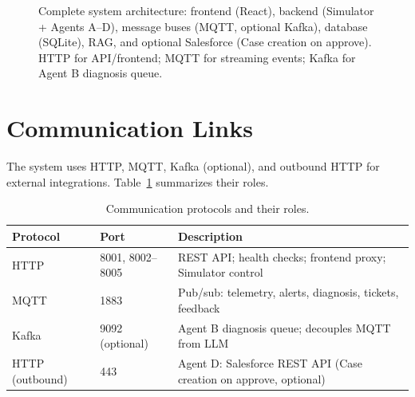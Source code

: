 \documentclass[12pt,letterpaper]{report}
\begin{document}
\begin{figure}[htbp]
\caption{Complete system architecture: frontend (React), backend (Simulator + Agents A--D), message buses (MQTT, optional Kafka), database (SQLite), RAG, and optional Salesforce (Case creation on approve). HTTP for API/frontend; MQTT for streaming events; Kafka for Agent B diagnosis queue.}
\label{fig:architecture_full}
\end{figure}

\section{Communication Links}

The system uses HTTP, MQTT, Kafka (optional), and outbound HTTP for external integrations. Table~\ref{tab:comm} summarizes their roles.

\begin{table}[htbp]
\centering
\caption{Communication protocols and their roles.}
\label{tab:comm}
\setlength{\tabcolsep}{6pt}
\begin{tabular}{llp{6.8cm}}
\toprule
\textbf{Protocol} & \textbf{Port} & \textbf{Description} \\
\midrule
HTTP & 8001, 8002--8005 & REST API; health checks; frontend proxy; Simulator control \\
MQTT & 1883 & Pub/sub: telemetry, alerts, diagnosis, tickets, feedback \\
Kafka & 9092 (optional) & Agent B diagnosis queue; decouples MQTT from LLM \\
HTTP (outbound) & 443 & Agent D: Salesforce REST API (Case creation on approve, optional) \\
\bottomrule
\end{tabular}
\end{table}
\end{document}
